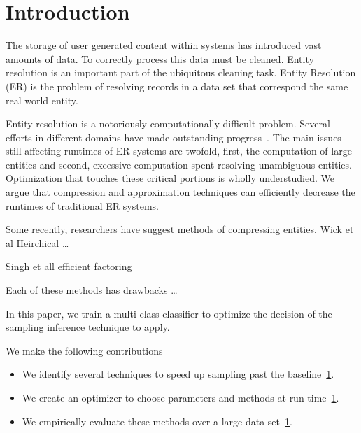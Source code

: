
\section{Introduction}

The storage of user generated content within systems has introduced 
vast amounts of data.
To correctly process this data must be cleaned. 
Entity resolution is an important part of the ubiquitous cleaning task.
Entity Resolution (ER) is the problem of resolving records in
a data set that correspond the same real world entity.

Entity resolution is a notoriously computationally difficult problem.
Several efforts in different domains have made outstanding progress~\cite{}.
The main issues still affecting runtimes of ER systems are
twofold, first, the computation of large entities and second, excessive
computation spent resolving unambiguous entities.
Optimization that touches these critical portions is wholly understudied.
We argue that compression and approximation 
techniques can efficiently decrease the runtimes of traditional ER systems.

Some recently, researchers have suggest methods of compressing entities.
Wick et al Heirchical \ldots

Singh et all efficient factoring %

Each of these methods has drawbacks \ldots

In this paper, we train a multi-class classifier to optimize the decision of
the sampling inference technique to apply.


We make the following contributions

\begin{itemize}
\item We identify several techniques to speed up sampling past the baseline~\ref{}.
\item We create an optimizer to choose parameters and methods at run time~\ref{}.
\item We empirically evaluate these methods over a large data set~\ref{}.
\end{itemize}




